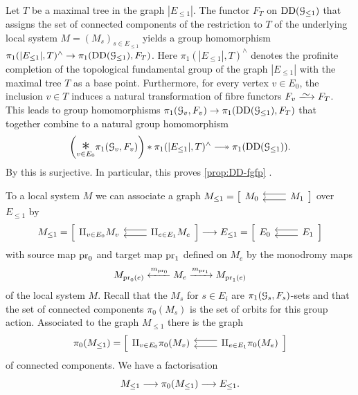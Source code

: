 Let $T$ be a maximal tree in the graph $|E_{\leq 1}|$. The functor $F_T$ on $\operatorname{DD}({\mathcal G}_{\leq 1})$ that assigns the set of connected components of the restriction to $T$ of the underlying local system $M = (M_s)_{s \in E_{\leq 1}}$ yields a group homomorphism $\pi_1(|E_{\leq 1}|,T)^\wedge \to \pi_1(\operatorname{DD}({\mathcal G}_{\leq 1}),F_T)$. Here $\pi_1(|E_{\leq 1}|,T)^\wedge$ denotes the profinite completion of the topological fundamental group of the graph $|E_{\leq 1}|$ with the maximal tree $T$ as a base point. Furthermore, for every vertex $v \in E_0$, the inclusion $v \in T$ induces a natural transformation of fibre functors $F_v \isomto F_T$. This leads to group homomorphisms $\pi_1({\mathcal G}_v,F_v) \to \pi_1(\operatorname{DD}({\mathcal G}_{\leq 1}),F_T)$ that together combine to a natural group homomorphism
\[
    \bigg(\underset{v \in E_0}{\resizebox{.3cm}{!}{$\ast$}} \pi_1(\cG_v,F_v)\bigg)  \ast \pi_1(|E_{\leq 1}|,T)^\wedge \surj \pi_1(\Desc(\cG_{\leq 1}))  .
\]
By \cite[Proposition~2.7]{Stix2006:vanKampen} this is surjective. In particular, this proves \cref{prop:DD-fgfp} .

To a local system $M$ we can associate a graph $M_{\leq 1} = \big[\begin{tikzcd}
M_0 & \ar[l,shift right=0.7ex] \ar[l,shift left=0.7ex]  M_1 
\end{tikzcd}\big]$ over $E_{\leq 1}$ by 
\[
M_{\leq 1} = 
\Big[\begin{tikzcd}
\amalg_{v \in E_0} M_v & \ar[l,shift right=0.7ex] \ar[l,shift left=0.7ex] \amalg_{e \in E_1} M_e 
\end{tikzcd}\Big] 
\la
E_{\leq 1} = \Big[\begin{tikzcd}
E_0 & \ar[l,shift right=0.7ex] \ar[l,shift left=0.7ex] E_1 
\end{tikzcd}\Big]
\]
with source map $\operatorname{pr}_0$ and target  map  $\operatorname{pr}_1$ defined on $M_e$ by the monodromy maps
\[
M_{\operatorname{pr}_0(e)} \xleftarrow{m_{\operatorname{pr}_0}} M_e  \xrightarrow{m_{\operatorname{pr}_1}} M_{\operatorname{pr}_1(e)}
\]
of the local system $M$.
Recall that the $M_s$ for $s \in E_i$ are $\pi_1({\mathcal G}_s,F_s)$-sets and that the set of connected components $\pi_0(M_s)$ is the set of orbits for this group action. Associated to the graph $M_{\leq 1}$ there is the graph 
\[
\pi_0(M_{\leq 1}) = 
\Big[\begin{tikzcd}
\amalg_{v \in E_0} \pi_0(M_v) & \ar[l,shift right=0.7ex] \ar[l,shift left=0.7ex] \amalg_{e \in E_1} \pi_0(M_e) 
\end{tikzcd}\Big]
\]
of connected components. We have a factorisation
\[
M_{\leq 1} \longrightarrow \pi_0(M_{\leq 1}) \longrightarrow E_{\leq 1}.
\]

